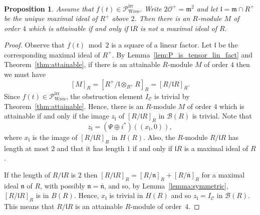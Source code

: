 \documentclass[11pt]{amsart}
\newcommand\cB{\mathcal{B}}
\newcommand\cC{\mathcal{C}}
\newcommand\cO{\mathcal{O}}
\newcommand\frl{\mathfrak{l}}
\newcommand\frm{\mathfrak{m}}
\newcommand\frn{\mathfrak{n}}
\theoremstyle{plain}
\newtheorem{proposition}[theorem]{Proposition}
\theoremstyle{definition}
\newcommand\PirrB{\mathcal{P}^\mathrm{irr}_\mathrm{Wres}}
\begin{document}
\begin{proposition}\label{prop:B_general}
    Assume that $f(t)\in\PirrB$.
    Write $2\cO^+=\frm^2$ and let $\frl=\frm\cap R^+$ be the unique maximal ideal of $R^+$ above $2$.
    Then there is an $R$-module $M$ of order $4$ which is attainable
    if and only if $\frl R$ is not a maximal ideal of $R$.
\end{proposition}
\begin{proof}
    Observe that $f(t) \bmod 2$ is a square of a linear factor.
    Let $\frl$ be the corresponding maximal ideal of $R^+$.
    By Lemma~\ref{lem:P_is_tensor_lin_fact} and Theorem~\ref{thm:attainable}, if there is an attainable $R$-module $M$ of order $4$ then we must have
    \[ [M]_R=[R^+/\frl\otimes_{R^+}R]_R=[R/\frl R]_R. \]
    Since $f(t)\in\PirrB$, the obstruction element $I_\cC$ is trivial by Theorem~\ref{thm:attainable}.
    Hence, there is an $R$-module $M$ of order $4$ which is attainable if and only if the image $z_\frl$ of $[R/\frl R]_R$ in $\cB(R)$ is trivial.
    Note that
    \[ z_\frl = (\Psi \oplus i^*)((x_\frl,0)), \]
    where $x_\frl$ is the image of $[R/\frl R]_R$ in $H(R)$.
    Also, the $R$-module $R/\frl R$ has length at most $2$ and that it has length $1$ if and only if $\frl R$ is a maximal ideal of $R$.

    If the length of $R/\frl R$ is $2$ then $[R/\frl R]_R=[R/\frn]_R+[R/\overline{\frn}]_R$ for a maximal ideal $\frn$ of $R$, with possibly $\frn=\overline{\frn}$, and so, by Lemma~\ref{lemma:symmetric}, $[R/\frl R]_R$ is in $B(R)$.
    Hence, $x_\frl$ is trivial in $H(R)$ and so $z_\frl = I_\cC$ in $\cB(R)$.
    This means that $R/\frl R$ is an attainable $R$-module of order~$4$.


\end{proof}
\end{document}
